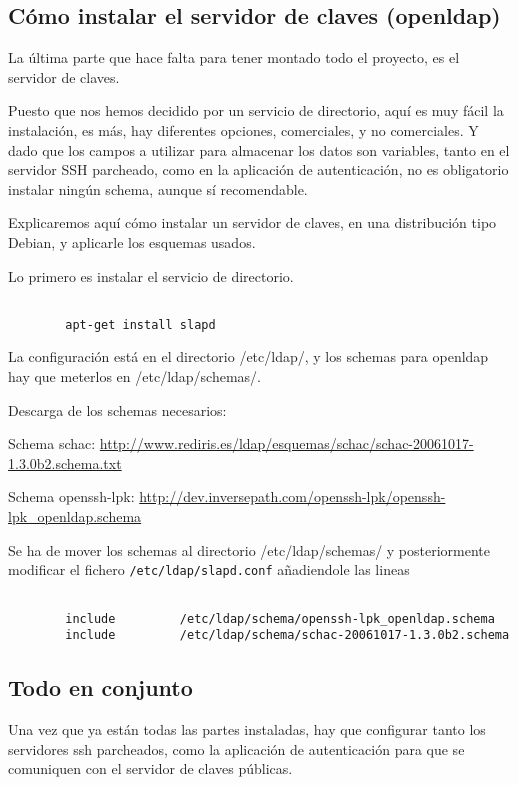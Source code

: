         \subsection{Cómo instalar el servidor de claves (openldap)}

        La última parte que hace falta para tener montado todo el
        proyecto, es el servidor de claves.

        Puesto que nos hemos decidido por un servicio de directorio,
        aquí es muy fácil la instalación, es más, hay diferentes
        opciones, comerciales, y no comerciales. Y dado que los
        campos a utilizar para almacenar los datos son variables,
        tanto en el servidor SSH parcheado, como en la aplicación de
        autenticación, no es obligatorio instalar ningún schema,
        aunque sí recomendable.

        Explicaremos aquí cómo instalar un servidor de claves, en una
        distribución tipo Debian, y aplicarle los esquemas usados.

        Lo primero es instalar el servicio de directorio.

        \begin{verbatim}

        apt-get install slapd

        \end{verbatim}

        La configuración está en el directorio /etc/ldap/, y los
        schemas para openldap hay que meterlos en /etc/ldap/schemas/.

        Descarga de los schemas necesarios:

        Schema schac: 
        \url{http://www.rediris.es/ldap/esquemas/schac/schac-20061017-1.3.0b2.schema.txt}

        Schema openssh-lpk:
        \url{http://dev.inversepath.com/openssh-lpk/openssh-lpk\_openldap.schema}


        Se ha de mover los schemas al directorio /etc/ldap/schemas/ y
        posteriormente modificar el fichero
        \texttt{/etc/ldap/slapd.conf} añadiendole las lineas

        \begin{verbatim}

        include         /etc/ldap/schema/openssh-lpk_openldap.schema
        include         /etc/ldap/schema/schac-20061017-1.3.0b2.schema

        \end{verbatim}

        
        \subsection{Todo en conjunto}

        Una vez que ya están todas las partes instaladas, hay que
        configurar tanto los servidores ssh parcheados, como la
        aplicación de autenticación para que se comuniquen con el
        servidor de claves públicas.

